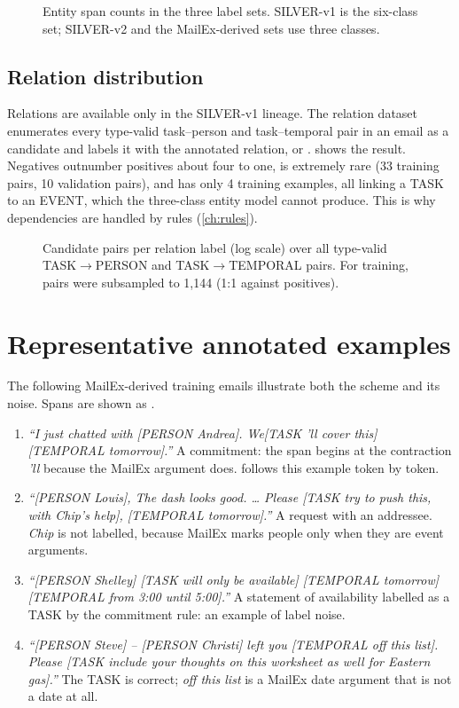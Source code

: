 \begin{figure}[t]
\centering
{}
\caption[Entity distributions across label sets]{Entity span counts in the three label sets. SILVER-v1 is the six-class set; SILVER-v2 and the MailEx-derived sets use three classes.}
\label{fig:entitydist}
\end{figure}

\subsection{Relation distribution}
Relations are available only in the SILVER-v1 lineage. The relation dataset enumerates every type-valid task--person and task--temporal pair in an email as a candidate and labels it with the annotated relation, or .  shows the result. Negatives outnumber positives about four to one,  is extremely rare (33 training pairs, 10 validation pairs), and  has only 4 training examples, all linking a TASK to an EVENT, which the three-class entity model cannot produce. This is why dependencies are handled by rules (\cref{ch:rules}).

\begin{figure}[t]
\centering
{}
\caption[Relation label distribution]{Candidate pairs per relation label (log scale) over all type-valid TASK$\to$PERSON and TASK$\to$TEMPORAL pairs. For training,  pairs were subsampled to 1,144 (1:1 against positives).}
\label{fig:reldist}
\end{figure}

\section{Representative annotated examples}
The following MailEx-derived training emails illustrate both the scheme and its noise. Spans are shown as .

\begin{enumerate}
  \item \emph{``I just chatted with [PERSON Andrea]. We[TASK 'll cover this] [TEMPORAL tomorrow].''} A commitment: the  span begins at the contraction \emph{'ll} because the MailEx  argument does.  follows this example token by token.
  \item \emph{``[PERSON Louis], The dash looks good. \ldots{} Please [TASK try to push this, with Chip's help], [TEMPORAL tomorrow].''} A request with an addressee. \emph{Chip} is not labelled, because MailEx marks people only when they are event arguments.
  \item \emph{``[PERSON Shelley] [TASK will only be available] [TEMPORAL tomorrow] [TEMPORAL from 3:00 until 5:00].''} A statement of availability labelled as a TASK by the commitment rule: an example of label noise.
  \item \emph{``[PERSON Steve] -- [PERSON Christi] left you [TEMPORAL off this list]. Please [TASK include your thoughts on this worksheet as well for Eastern gas].''} The TASK is correct; \emph{off this list} is a MailEx date argument that is not a date at all.
\end{enumerate}

